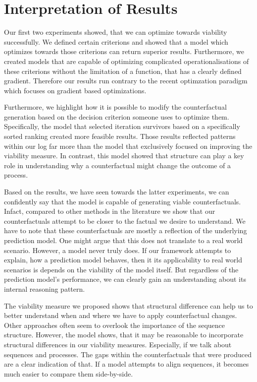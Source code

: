 \documentclass[12pt,a4paper]{report}
\begin{document}
\section{Interpretation of Results}
Our first two experiments showed, that we can optimize towards viability successfully. We defined certain criterions and showed that a model which optimizes towards those criterions can return superior results. Furthermore, we created models that are capable of optimizing complicated operationalisations of these criterions without the limitation of a function, that has a clearly defined gradient. Therefore our results run contrary to the recent optimzation paradigm which focuses on gradient based optimizations. 

Furthermore, we highlight how it is possible to modify the counterfactual generation based on the decision criterion someone uses to optimize them. Specifically, the model that selected iteration survivors based on a specifically sorted ranking created more feasible results. Those results reflected patterns within our log far more than the model that exclusively focused on improving the viability measure. In contrast, this model showed that structure can play a key role in understanding why a counterfactual might change the outcome of a process. 

Based on the results, we have seen towards the latter experiments, we can confidently say that the model is capable of generating viable counterfactuals. Infact, compared to other methods in the literature we show that our counterfactuals attempt to be closer to the factual we desire to understand. We have to note that these counterfactuals are mostly a reflection of the underlying prediction model. One might argue that this does not translate to a real world scenario. However, a model never truly does. If our framework attempts to explain, how a prediction model behaves, then it its applicability to real world scenarios is depends on the viability of the model itself. But regardless of the prediction model's performance, we can clearly gain an understanding about its internal reasoning pattern.

The viability measure we proposed shows that structural difference can help us to better understand when and where we have to apply counterfactual changes. Other approaches often seem to overlook the importance of the sequence structure. However, the  model shows, that it may be reasonable to incorporate structural differences in our viability measures. Especially, if we talk about sequences and processes. The gaps within the counterfactuals that were produced are a clear indication of that. If a model attempts to align sequences, it becomes much easier to compare them side-by-side.  
\end{document}
